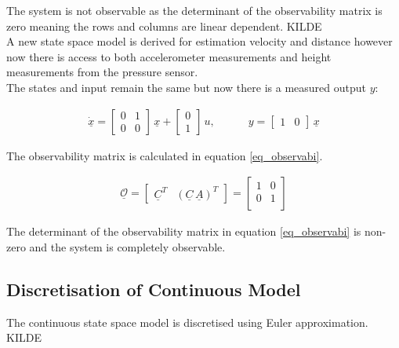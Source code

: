 \documentclass[fleqn,10pt]{olplainarticle}
\begin{document}
 The system is not observable as the determinant of the observability matrix is zero meaning the rows and columns are linear dependent. KILDE\\

 A new state space model is derived for estimation velocity and distance however now there is access to both accelerometer measurements and height measurements from the pressure sensor.\\

 The states and input remain the same but now there is a measured output $y$:

\begin{align}
    \underline{\dot{x}}= 
    \begin{bmatrix}
    0 & 1\\
    0 & 0
    \end{bmatrix}
    \, 
    \underline{x} +
    \begin{bmatrix}
    0\\
    1
    \end{bmatrix}
    \, u, \quad \quad \quad
    y =
    \begin{bmatrix}
    1 & 0
    \end{bmatrix}
    \,
    \underline{x} 
\end{align}


 The observability matrix is calculated in equation \ref{eq_observabi}.

\begin{align}
    \underline{\mathcal{O}} =
    \begin{bmatrix}
    \underline{C}^T & (\underline{C}\,\underline{A})^T
    \end{bmatrix}
    =
    \begin{bmatrix}
    1 & 0 \\
    0 & 1 \\
    \end{bmatrix}
    \label{eq_observabi}
\end{align}

 The determinant of the observability matrix in equation \ref{eq_observabi} is non-zero and the system is completely observable.



\subsection{Discretisation of Continuous Model}

The continuous state space model is discretised using Euler approximation. KILDE 
\end{document}
